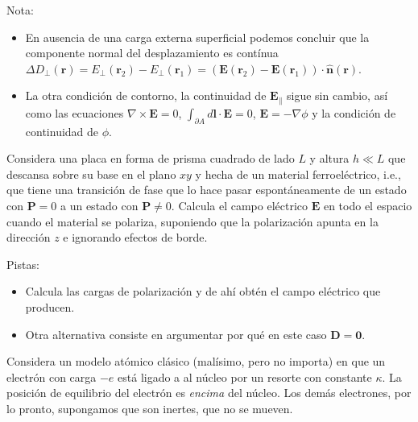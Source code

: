 \documentclass{exam}
\begin{document}
\begin{questions}
  Nota:
  \begin{itemize}
  \item En ausencia de una carga externa superficial podemos concluir
    que la componente normal del desplazamiento es contínua $\Delta
    D_\perp(\bm r)=E_\perp(\bm r_2)-E_\perp(\bm r_1)=(\bm E(\bm r_2)-\bm
    E(\bm r_1))\cdot\hat{\bm n}(\bm r)$.
  \item La otra condición de contorno, la continuidad de $\bm E_\|$
    sigue sin cambio, así como las ecuaciones $\nabla\times\bm E=0$,
    $\int_{\partial A}d \bm l\cdot\bm E=0$, $\bm E=-\nabla\phi$ y la
    condición de continuidad de $\phi$.
  \end{itemize}

  \question Considera una placa en forma de prisma cuadrado de lado
  $L$ y altura $h\ll L$ que descansa sobre su base en el plano $xy$ y
  hecha de un material ferroeléctrico, i.e., que
  tiene una transición de fase que lo hace pasar espontáneamente de un
  estado con $\bm P=0$ a un estado con $\bm P\ne 0$. Calcula el campo
  eléctrico $\bm E$ en todo el espacio cuando el material se polariza,
  suponiendo que la polarización apunta en la dirección $z$ e
  ignorando efectos de borde.

  Pistas:
  \begin{itemize}
  \item Calcula las cargas de polarización y de ahí obtén el campo
    eléctrico que producen.
  \item Otra alternativa consiste en argumentar por qué en este caso
    $\bm D=\bm 0$.
  \end{itemize}

  \question Considera un modelo atómico clásico (malísimo, pero no importa) en
  que un electrón con carga $-e$ está ligado a al núcleo por un
  resorte con constante $\kappa$. La posición de equilibrio del electrón
  es {\em encima} del núcleo. Los demás electrones, por lo pronto,
  supongamos que son inertes, que no se mueven.
\end{questions}
\end{document}
